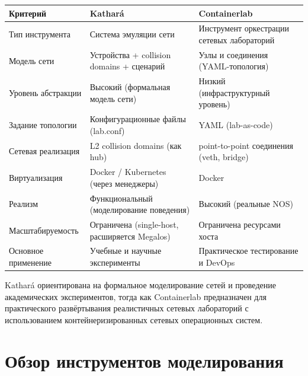 \documentclass[
  english,
  russian,
  12pt,
  a4paper,
]{phdthesr}
\begin{document}
\begin{longtable}[]{@{}
  >{\raggedright\arraybackslash}p{}
  >{\raggedright\arraybackslash}p{}
  >{\raggedright\arraybackslash}p{}@{}}
\toprule\noalign{}
\begin{minipage}[b]{\linewidth}\raggedright
Критерий
\end{minipage} & \begin{minipage}[b]{\linewidth}\raggedright
Kathará
\end{minipage} & \begin{minipage}[b]{\linewidth}\raggedright
Containerlab
\end{minipage} \\
\midrule\noalign{}
\endhead
\bottomrule\noalign{}
\endlastfoot
Тип инструмента & Система эмуляции сети & Инструмент оркестрации сетевых
лабораторий \\
Модель сети & Устройства + collision domains + сценарий & Узлы и
соединения (YAML-топология) \\
Уровень абстракции & Высокий (формальная модель сети) & Низкий
(инфраструктурный уровень) \\
Задание топологии & Конфигурационные файлы (lab.conf) & YAML
(lab-as-code) \\
Сетевая реализация & L2 collision domains (как hub) & point-to-point
соединения (veth, bridge) \\
Виртуализация & Docker / Kubernetes (через менеджеры) & Docker \\
Реализм & Функциональный (моделирование поведения) & Высокий (реальные
NOS) \\
Масштабируемость & Ограничена (single-host, расширяется Megalos) &
Ограничена ресурсами хоста \\
Основное применение & Учебные и научные эксперименты & Практическое
тестирование и DevOps \\
\end{longtable}

Kathará ориентирована на формальное моделирование сетей и проведение
академических экспериментов, тогда как Containerlab предназначен для
практического развёртывания реалистичных сетевых лабораторий с
использованием контейнеризированных сетевых операционных систем.


\chapter{Обзор инструментов
моделирования}\label{ux43eux431ux437ux43eux440-ux438ux43dux441ux442ux440ux443ux43cux435ux43dux442ux43eux432-ux43cux43eux434ux435ux43bux438ux440ux43eux432ux430ux43dux438ux44f}
\end{document}
